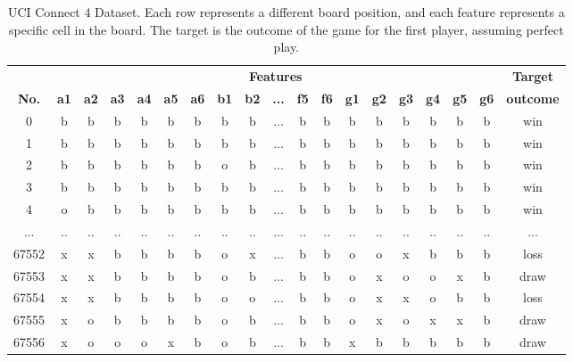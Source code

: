 \documentclass{article}
\begin{document}
\begin{table}[b!]
\small
\centering
\renewcommand{\arraystretch}{1.2}
{
\begin{tabular}{ c | c c c c c c c c c c c c c c c c c | c }
\rowcolor{header}
 & \multicolumn{17}{c|}{\textbf{Features}} &  \textbf{Target} \\ \rowcolor{header}
\textbf{No.} & \textbf{a1} & \textbf{a2} & \textbf{a3} & \textbf{a4} & \textbf{a5} &
    \textbf{a6} & \textbf{b1} & \textbf{b2} & \textbf{...} & \textbf{f5} & \textbf{f6} &
    \textbf{g1} & \textbf{g2} & \textbf{g3} & \textbf{g4} & \textbf{g5} & \textbf{g6} & \textbf{outcome} \\ 
0      &  b &  b &  b &  b &  b &  b &  b &  b & ... &  b &  b &  b &  b &  b &  b &  b &  b &     win \\
1      &  b &  b &  b &  b &  b &  b &  b &  b & ... &  b &  b &  b &  b &  b &  b &  b &  b &     win \\
2      &  b &  b &  b &  b &  b &  b &  o &  b & ... &  b &  b &  b &  b &  b &  b &  b &  b &     win \\
3      &  b &  b &  b &  b &  b &  b &  b &  b & ... &  b &  b &  b &  b &  b &  b &  b &  b &     win \\
4      &  o &  b &  b &  b &  b &  b &  b &  b & ... &  b &  b &  b &  b &  b &  b &  b &  b &     win \\
...    & .. & .. & .. & .. & .. & .. & .. & .. & ... & .. & .. & .. & .. & .. & .. & .. & .. &     ... \\
67552  &  x &  x &  b &  b &  b &  b &  o &  x & ... &  b &  b &  o &  o &  x &  b &  b &  b &    loss \\
67553  &  x &  x &  b &  b &  b &  b &  o &  b & ... &  b &  b &  o &  x &  o &  o &  x &  b &    draw \\
67554  &  x &  x &  b &  b &  b &  b &  o &  o & ... &  b &  b &  o &  x &  x &  o &  b &  b &    loss \\
67555  &  x &  o &  b &  b &  b &  b &  o &  b & ... &  b &  b &  o &  x &  o &  x &  x &  b &    draw \\
67556  &  x &  o &  o &  o &  x &  b &  o &  b & ... &  b &  b &  x &  b &  b &  b &  b &  b &    draw \\
\end{tabular}
}
\caption{UCI Connect 4 Dataset. Each row represents a different board position, and each feature
         represents a specific cell in the board. The target is the outcome of the game for the
         first player, assuming perfect play.}
\label{table:uci-dataset}
\end{table}
\end{document}
